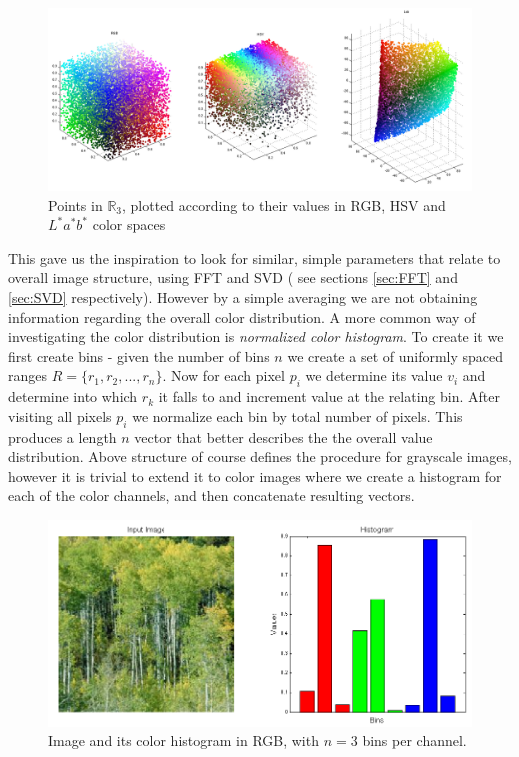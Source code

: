 \documentclass{report}
\begin{document}
\begin{figure}[hbtp]
\centering
\includegraphics[scale=0.3]{graphics/colorSpaces.png}
\caption{Points in $\mathbb{R}_3$, plotted according to their values in RGB, HSV and $L^*a^*b^*$ color spaces }
\label{fig:colSpaces}
\end{figure}

This gave us the inspiration to look for similar, simple parameters that relate to overall image structure, using FFT and SVD ( see sections \ref{sec:FFT} and \ref{sec:SVD} respectively). However by a simple averaging we are not obtaining information regarding the overall color distribution. A more common way of investigating the color distribution is \textit{normalized color histogram}. To create it we first create bins - given the number of bins $n$ we create a set of uniformly spaced ranges $R = \{r_1, r_2, ..., r_n\}$. Now for each pixel $p_i$ we determine its value $v_i$ and determine into which $r_k$ it falls to and increment value at the relating bin. After visiting all pixels $p_i$ we normalize each bin by total number of pixels. This produces a length $n$ vector that better describes the the overall value distribution. Above structure of course defines the procedure for grayscale images, however it is trivial to extend it to color images where we create a histogram for each of the color channels, and then concatenate resulting vectors.

\begin{figure}[hbtp]
\centering
\includegraphics[scale=0.3]{graphics/colorHistogram.png}
\caption{Image and its color histogram in RGB, with $n = 3$ bins per channel. }
\label{fig:colSpaces}
\end{figure}
\end{document}

